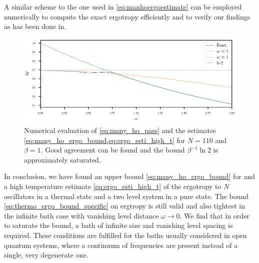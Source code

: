 A similar scheme to the one used in \cref{eq:manhoergoestimate} can be
employed numerically to compute the exact ergotropy efficiently and to verify our
findings as has been done in.
\begin{figure}[hp]
  \includegraphics{figs/ergo_calc/ergo_numeric}
  \caption{\label{fig:numeric_n_ho_ergo} Numerical evaluation of
    \cref{eq:many_ho_pass} and the estimates
    \cref{eq:many_ho_ergo_bound,eq:ergo_esti_high_t} for \(N=110\)
    and \(β=1\). Good agreement can be found and the bound
    \(β^{-1}\ln2\) is approximately saturated.}
\end{figure}

In conclusion, we have found an upper bound
\cref{eq:many_ho_ergo_bound} for and a high temperature estimate
\cref{eq:ergo_esti_high_t} of the ergotropy to \(N\) oscillators in a
thermal state and a two level system in a pure state. The bound
\cref{eq:thermo_ergo_bound_specific} on ergtropy is still valid and
also tightest in the infinite bath case with vanishing level distance
\(ω\to 0\). We find that in order to saturate the bound, a bath of
infinite size and vanishing level spacing is required. These
conditions are fulfilled for the baths usually considered in open
quantum systems, where a continuum of frequencies are present instead
of a single, very degenerate one.

